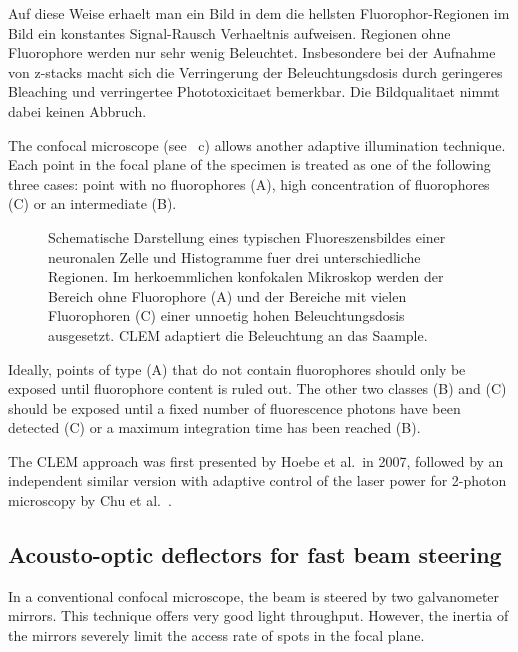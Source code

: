 Auf diese Weise erhaelt man ein Bild in dem die hellsten
Fluorophor-Regionen im Bild ein konstantes Signal-Rausch Verhaeltnis
aufweisen. Regionen ohne Fluorophore werden nur sehr wenig
Beleuchtet. Insbesondere bei der Aufnahme von z-stacks macht sich die
Verringerung der Beleuchtungsdosis durch geringeres Bleaching und
verringertee Phototoxicitaet bemerkbar. Die Bildqualitaet nimmt dabei
keinen Abbruch.


The confocal microscope (see ~c)
allows another adaptive illumination technique. Each point in the
focal plane of the specimen is treated as one of the following three
cases: point with no fluorophores (A), high concentration of
fluorophores (C) or an intermediate (B).
\begin{figure}[hbtp]
  \centering
  \caption{Schematische Darstellung eines typischen Fluoreszensbildes
    einer neuronalen Zelle und Histogramme fuer drei unterschiedliche
    Regionen. Im herkoemmlichen konfokalen Mikroskop werden der
    Bereich ohne Fluorophore (A) und der Bereiche mit vielen
    Fluorophoren (C) einer unnoetig hohen Beleuchtungsdosis
    ausgesetzt. CLEM adaptiert die Beleuchtung an das Saample.}
  \label{fig:clem}
\end{figure}

Ideally, points of type (A) that do not contain fluorophores should
only be exposed until fluorophore content is ruled out. The other two
classes (B) and (C) should be exposed until a fixed number of
fluorescence photons have been detected (C) or a maximum integration
time has been reached (B).


The CLEM approach was first presented by Hoebe et al.\ in 2007,
followed by an independent similar version with adaptive control of
the laser power for 2-photon microscopy by Chu et al.\
\citep{Hoebe2007,Chu2007}.

\subsection{Acousto-optic deflectors for fast beam steering}
In a conventional confocal microscope, the beam is steered by two
galvanometer mirrors. This technique offers very good light
throughput. However, the inertia of the mirrors severely limit the
access rate of spots in the focal plane.

